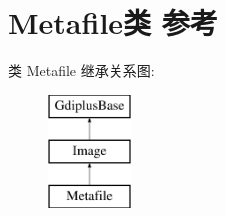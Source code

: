 \hypertarget{class_metafile}{}\section{Metafile类 参考}
\label{class_metafile}
类 Metafile 继承关系图\+:\begin{figure}[H]
\begin{center}
\leavevmode
\includegraphics[height=3.000000cm]{class_metafile}
\end{center}
\end{figure}
